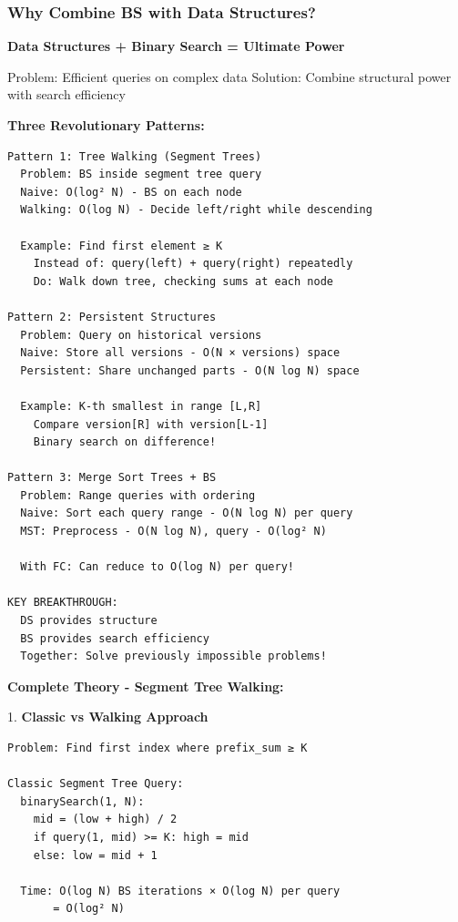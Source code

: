 \documentclass[11pt,a4paper,oneside]{book}
\begin{document}
\subsubsection{Why Combine BS with Data Structures?}

\begin{tcolorbox}[
    enhanced,breakable,
    colback=white,
    colframe=deepblue,
    boxrule=1.5pt,
    arc=3mm,
    title=\textbf{The Ultimate Optimization Paradigm}
]
\textbf{Data Structures + Binary Search = Ultimate Power}

Problem: Efficient queries on complex data
Solution: Combine structural power with search efficiency

\textbf{Three Revolutionary Patterns:}
\begin{verbatim}
Pattern 1: Tree Walking (Segment Trees)
  Problem: BS inside segment tree query
  Naive: O(log² N) - BS on each node
  Walking: O(log N) - Decide left/right while descending
  
  Example: Find first element ≥ K
    Instead of: query(left) + query(right) repeatedly
    Do: Walk down tree, checking sums at each node

Pattern 2: Persistent Structures
  Problem: Query on historical versions
  Naive: Store all versions - O(N × versions) space
  Persistent: Share unchanged parts - O(N log N) space
  
  Example: K-th smallest in range [L,R]
    Compare version[R] with version[L-1]
    Binary search on difference!

Pattern 3: Merge Sort Trees + BS
  Problem: Range queries with ordering
  Naive: Sort each query range - O(N log N) per query
  MST: Preprocess - O(N log N), query - O(log² N)
  
  With FC: Can reduce to O(log N) per query!

KEY BREAKTHROUGH:
  DS provides structure
  BS provides search efficiency
  Together: Solve previously impossible problems!
\end{verbatim}

\textbf{Complete Theory - Segment Tree Walking:}

1. \textbf{Classic vs Walking Approach}
\begin{verbatim}
Problem: Find first index where prefix_sum ≥ K

Classic Segment Tree Query:
  binarySearch(1, N):
    mid = (low + high) / 2
    if query(1, mid) >= K: high = mid
    else: low = mid + 1
  
  Time: O(log N) BS iterations × O(log N) per query
       = O(log² N)


\end{verbatim}
\end{tcolorbox}
\end{document}
